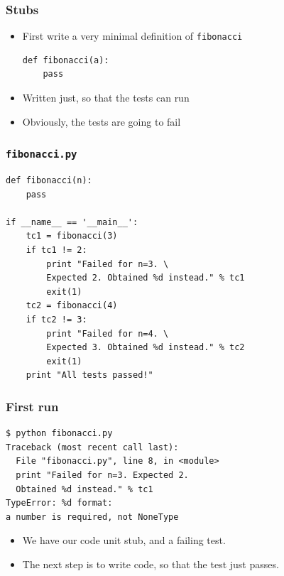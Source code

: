 \documentclass[12pt,presentation]{beamer}
\begin{document}
\begin{frame}[fragile]
  \frametitle{Stubs}
  \begin{itemize}
  \item First write a very minimal definition of \texttt{fibonacci}
    \begin{lstlisting}
def fibonacci(a):
    pass
    \end{lstlisting}
  \item Written just, so that the tests can run
  \item Obviously, the tests are going to fail
  \end{itemize}
\end{frame}
\begin{frame}[fragile]
  \frametitle{\texttt{fibonacci.py}}
\begin{lstlisting}
def fibonacci(n):
    pass

if __name__ == '__main__':
    tc1 = fibonacci(3)
    if tc1 != 2:
        print "Failed for n=3. \
        Expected 2. Obtained %d instead." % tc1
        exit(1)
    tc2 = fibonacci(4)
    if tc2 != 3:
        print "Failed for n=4. \
        Expected 3. Obtained %d instead." % tc2
        exit(1)
    print "All tests passed!"
\end{lstlisting}
\end{frame}
\begin{frame}[fragile]
  \frametitle{First run}
\begin{lstlisting}
$ python fibonacci.py
Traceback (most recent call last):
  File "fibonacci.py", line 8, in <module> 
  print "Failed for n=3. Expected 2. 
  Obtained %d instead." % tc1
TypeError: %d format: 
a number is required, not NoneType
\end{lstlisting} %

  \begin{itemize}
  \item We have our code unit stub, and a failing test. 
  \item The next step is to write code, so that the test just passes.
  \end{itemize}
\end{frame}
\end{document}
